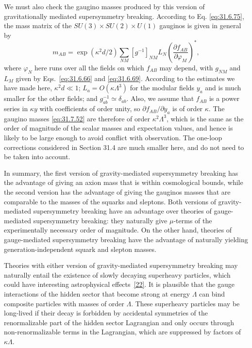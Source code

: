 We must also check the gaugino masses produced by this version of
gravitationally mediated supersymmetry breaking. According to Eq.
\eqref{eq:31.6.75}, the mass matrix of the
\(SU(3)\times SU(2)\times U(1)\) gauginos is given in general by
\begin{equation}
  m_{AB}
  =\exp(\kappa^2d/2)\sum_{NM}[g^{-1}]_{NM}L_N
    \left(\frac{\partial f_{AB}}{\partial\varphi_M}\right)^*,
  \tag{31.7.52}\label{eq:31.7.52}
\end{equation}
where \(\varphi_N\) here runs over all the fields on which \(f_{AB}\) may
depend, with \(g_{NM}\) and \(L_M\) given by Eqs.~\eqref{eq:31.6.66} and
\eqref{eq:31.6.69}. According to the estimates we have made here,
\(\kappa^2d\ll1\); \(L_a=O(\kappa\Lambda^3)\) for the modular fields \(y_a\)
and is much smaller for the other fields; and \(g_{ab}^{-1}\simeq
\delta_{ab}\). Also, we assume that \(f_{AB}\) is a power series in
\(\kappa y\) with coefficients of order unity, so
\(\partial f_{AB}/\partial y_a\) is of order \(\kappa\). The gaugino masses
\eqref{eq:31.7.52} are therefore of order \(\kappa^2\Lambda^3\), which is
the same as the order of magnitude of the scalar masses and expectation
values, and hence is likely to be large enough to avoid conflict with
observation. The one-loop corrections considered in Section 31.4 are much
smaller here, and do not need to be taken into account.

In summary, the first version of gravity-mediated supersymmetry breaking has
the advantage of giving an axion mass that is within cosmological bounds,
while the second version has the advantage of giving the gauginos masses
that are comparable to the masses of the squarks and sleptons. Both
versions of gravity-mediated supersymmetry breaking have an advantage over
theories of gauge-mediated supersymmetry breaking: they naturally give
\(\mu\)-terms of the experimentally necessary order of magnitude. On the
other hand, theories of gauge-mediated supersymmetry breaking have the
advantage of naturally yielding generation-independent squark and slepton
masses.

Theories with either version of gravity-mediated supersymmetry breaking may
naturally entail the existence of slowly decaying superheavy particles,
which could have interesting astrophysical
effects~\hyperref[ch31-ref-22]{[22]}. It is plausible that the gauge
interactions of the hidden sector that become strong at energy \(\Lambda\)
can bind composite particles with masses of order \(\Lambda\). These
superheavy particles may be long-lived if their decay is forbidden by
accidental symmetries of the renormalizable part of the hidden sector
Lagrangian and only occurs through non-renormalizable terms in the
Lagrangian, which are suppressed by factors of \(\kappa\Lambda\).
